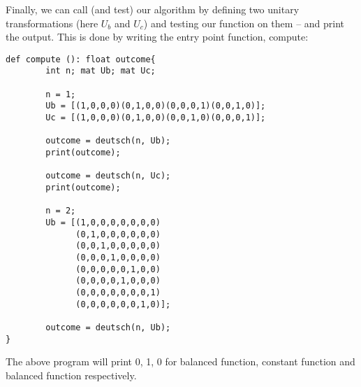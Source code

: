 Finally, we can call (and test) our algorithm by defining two unitary transformations (here $U_b$ and $U_c$) and testing our function on them -- and print the output. This is done by writing the entry point function, \textsf{compute}:
\begin{lstlisting}
def compute (): float outcome{
        int n; mat Ub; mat Uc;

        n = 1;
        Ub = [(1,0,0,0)(0,1,0,0)(0,0,0,1)(0,0,1,0)];
        Uc = [(1,0,0,0)(0,1,0,0)(0,0,1,0)(0,0,0,1)];

        outcome = deutsch(n, Ub);
        print(outcome);
        
        outcome = deutsch(n, Uc);
        print(outcome);

        n = 2;
        Ub = [(1,0,0,0,0,0,0,0) 
              (0,1,0,0,0,0,0,0)
              (0,0,1,0,0,0,0,0)
              (0,0,0,1,0,0,0,0) 
              (0,0,0,0,0,1,0,0) 
              (0,0,0,0,1,0,0,0)
              (0,0,0,0,0,0,0,1)
              (0,0,0,0,0,0,1,0)];

        outcome = deutsch(n, Ub);
}
\end{lstlisting}

The above program will print 0, 1, 0 for balanced function, constant function and balanced function respectively.
